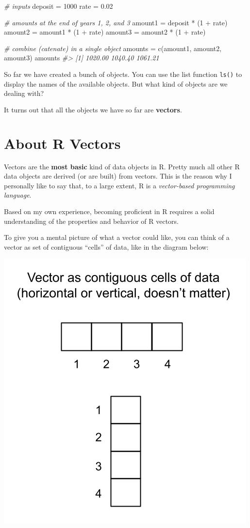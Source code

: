\documentclass[
]{book}
\newenvironment{Shaded}{\begin{snugshade}}{\end{snugshade}}
\newcommand{\CommentTok}[1]{\textcolor[rgb]{0.56,0.35,0.01}{\textit{#1}}}
\newcommand{\DecValTok}[1]{\textcolor[rgb]{0.00,0.00,0.81}{#1}}
\newcommand{\FloatTok}[1]{\textcolor[rgb]{0.00,0.00,0.81}{#1}}
\newcommand{\FunctionTok}[1]{\textcolor[rgb]{0.00,0.00,0.00}{#1}}
\newcommand{\NormalTok}[1]{#1}
\newcommand{\OtherTok}[1]{\textcolor[rgb]{0.56,0.35,0.01}{#1}}
\newcommand{\SpecialCharTok}[1]{\textcolor[rgb]{0.00,0.00,0.00}{#1}}
\begin{document}
\begin{Shaded}
\begin{Highlighting}[]
\CommentTok{\# inputs}
\NormalTok{deposit }\OtherTok{=} \DecValTok{1000}
\NormalTok{rate }\OtherTok{=} \FloatTok{0.02}

\CommentTok{\# amounts at the end of years 1, 2, and 3}
\NormalTok{amount1 }\OtherTok{=}\NormalTok{ deposit }\SpecialCharTok{*}\NormalTok{ (}\DecValTok{1} \SpecialCharTok{+}\NormalTok{ rate)}
\NormalTok{amount2 }\OtherTok{=}\NormalTok{ amount1 }\SpecialCharTok{*}\NormalTok{ (}\DecValTok{1} \SpecialCharTok{+}\NormalTok{ rate)}
\NormalTok{amount3 }\OtherTok{=}\NormalTok{ amount2 }\SpecialCharTok{*}\NormalTok{ (}\DecValTok{1} \SpecialCharTok{+}\NormalTok{ rate)}

\CommentTok{\# combine (catenate) in a single object}
\NormalTok{amounts }\OtherTok{=} \FunctionTok{c}\NormalTok{(amount1, amount2, amount3)}
\NormalTok{amounts}
\CommentTok{\#\textgreater{} [1] 1020.00 1040.40 1061.21}
\end{Highlighting}
\end{Shaded}

So far we have created a bunch of objects. You can use the list function \texttt{ls()}
to display the names of the available objects. But what kind of objects are we
dealing with?

It turns out that all the objects we have so far are \textbf{vectors}.

\hypertarget{about-r-vectors}{%
\section{About R Vectors}\label{about-r-vectors}}

Vectors are the \textbf{most basic} kind of data objects in R. Pretty much all other
R data objects are derived (or are built) from vectors. This is the reason why
I personally like to say that, to a large extent, R is a
\emph{vector-based programming language}.

Based on my own experience, becoming proficient in R requires a solid
understanding of the properties and behavior of R vectors.

To give you a mental picture of what a vector could like, you can think of a
vector as set of contiguous ``cells'' of data, like in the diagram below:

\begin{center}\includegraphics[width=0.4\linewidth]{images/objects/obj-vectors} \end{center}
\end{document}
